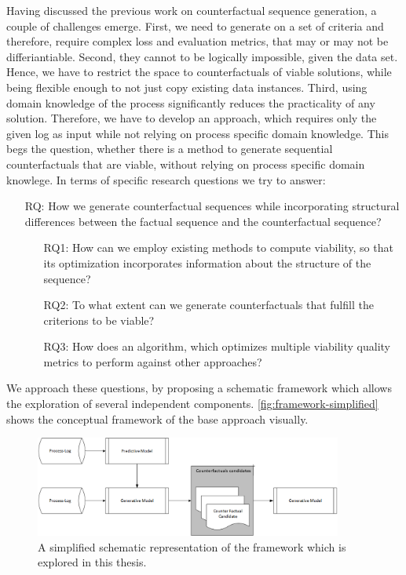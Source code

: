 \documentclass[./../../paper.tex]{subfiles}
\begin{document}
Having discussed the previous work on counterfactual sequence generation, a couple of challenges emerge.
First, we need to generate on a set of criteria and therefore, require complex loss and evaluation metrics, that may or may not be differiantiable. Second, they cannot to be logically impossible, given the data set.
Hence, we have to restrict the space to counterfactuals of viable solutions, while being flexible enough to not just copy existing data instances.
Third, using domain knowledge of the process significantly reduces the practicality of any solution. Therefore, we have to develop an approach, which requires only the given log as input while not relying on process specific domain knowledge. This begs the question, whether there is a method to generate sequential counterfactuals that are viable, without relying on process specific domain knowlege. In terms of specific research questions we try to answer:

\begin{itemize}
    \item[RQ:] How we generate counterfactual sequences while incorporating structural differences between the factual sequence and the counterfactual sequence?
          \begin{itemize}
            \item[RQ1:] How can we employ existing methods to compute viability, so that its optimization incorporates information about the structure of the sequence?
              \item[RQ2:] To what extent can we generate counterfactuals that fulfill the criterions to be viable?
              \item[RQ3:] How does an algorithm, which optimizes multiple viability quality metrics to perform against other approaches?
          \end{itemize}
\end{itemize}

\noindent We approach these questions, by proposing a schematic framework which allows the exploration of several independent components. \autoref{fig:framework-simplified} shows the conceptual framework of the base approach visually.

\begin{figure}[htb]
    \centering
    \includegraphics[width=0.9\textwidth]{figures/framework_simplified.png}
    \caption{A simplified schematic representation of the framework which is explored in this thesis.}
    \label{fig:framework-simplified}
\end{figure}
\end{document}
